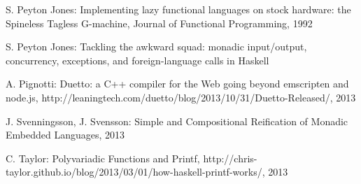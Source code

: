 \documentclass[preprint]{sigplanconf}
\begin{document}
\begin{thebibliography}{}
S. Peyton Jones: Implementing lazy functional languages on stock hardware: the Spineless Tagless G-machine, Journal of Functional Programming, 1992

S. Peyton Jones: Tackling the awkward squad: monadic input/output, concurrency, exceptions, and foreign-language calls in Haskell

A. Pignotti: Duetto: a C++ compiler for the Web going beyond emscripten and node.js, http://leaningtech.com/duetto/blog/2013/10/31/Duetto-Released/, 2013

J. Svenningsson, J. Svensson: Simple and Compositional Reification of Monadic Embedded Languages, 2013

C. Taylor: Polyvariadic Functions and Printf, http://chris-taylor.github.io/blog/2013/03/01/how-haskell-printf-works/, 2013

\end{thebibliography}
\end{document}

